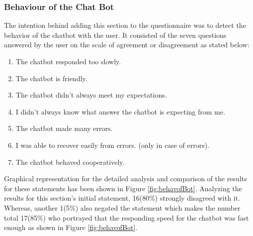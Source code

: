 \subsubsection*{Behaviour of the Chat Bot}
The intention behind adding this section to the questionnaire was to detect the behavior of the chatbot with the user. It consisted of the seven questions answered by the user on the scale of agreement or disagreement as stated below: 
\begin{enumerate}
    \item The chatbot responded too slowly.
    \item The chatbot is friendly.
    \item The chatbot didn't always meet my expectations.
    \item I didn't always know what answer the chatbot is expecting from me.
    \item The chatbot made many errors.
    \item I was able to recover easily from errors. (only in case of errors).
    \item The chatbot behaved cooperatively.
\end{enumerate}
Graphical representation for the detailed analysis and comparison of the results for these statements has been shown in Figure \ref{fig:behavofBot}. Analyzing the results for this section's initial statement, 16(80\%) strongly disagreed with it. Whereas, another 1(5\%) also negated the statement which makes the number total 17(85\%) who portrayed that the responding speed for the chatbot was fast enough as shown in Figure \ref{fig:behavofBot}. 


